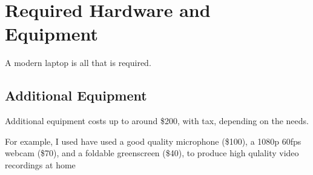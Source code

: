 \documentclass[sigconf]{acmart}
\begin{document}
\section{Required Hardware and Equipment}
A modern laptop is all that is required.








\subsection{Additional Equipment}
Additional equipment costs up to around \$200, with tax, depending on the needs.

For example, I used have used a good quality microphone (\$100), a 1080p 60fps webcam (\$70), and a foldable greenscreen (\$40), to produce high qulality video recordings at home
\end{document}
